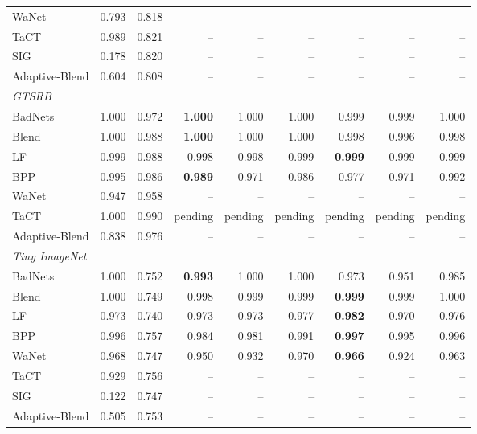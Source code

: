 \begin{table}[htbp]
\begin{tabular}{lrrrrrrrr}
WaNet & 0.793 & 0.818 & -- & -- & -- & -- & -- & -- \\
TaCT & 0.989 & 0.821 & -- & -- & -- & -- & -- & -- \\
SIG & 0.178 & 0.820 & -- & -- & -- & -- & -- & -- \\
Adaptive-Blend & 0.604 & 0.808 & -- & -- & -- & -- & -- & -- \\
\midrule
\multicolumn{9}{l}{\textit{GTSRB}} \\
BadNets & 1.000 & 0.972 & \textbf{1.000} & 1.000 & 1.000 & 0.999 & 0.999 & 1.000 \\
Blend & 1.000 & 0.988 & \textbf{1.000} & 1.000 & 1.000 & 0.998 & 0.996 & 0.998 \\
LF & 0.999 & 0.988 & 0.998 & 0.998 & 0.999 & \textbf{0.999} & 0.999 & 0.999 \\
BPP & 0.995 & 0.986 & \textbf{0.989} & 0.971 & 0.986 & 0.977 & 0.971 & 0.992 \\
WaNet & 0.947 & 0.958 & -- & -- & -- & -- & -- & -- \\
TaCT & 1.000 & 0.990 & pending & pending & pending & pending & pending & pending \\
Adaptive-Blend & 0.838 & 0.976 & -- & -- & -- & -- & -- & -- \\
\midrule
\multicolumn{9}{l}{\textit{Tiny ImageNet}} \\
BadNets & 1.000 & 0.752 & \textbf{0.993} & 1.000 & 1.000 & 0.973 & 0.951 & 0.985 \\
Blend & 1.000 & 0.749 & 0.998 & 0.999 & 0.999 & \textbf{0.999} & 0.999 & 1.000 \\
LF & 0.973 & 0.740 & 0.973 & 0.973 & 0.977 & \textbf{0.982} & 0.970 & 0.976 \\
BPP & 0.996 & 0.757 & 0.984 & 0.981 & 0.991 & \textbf{0.997} & 0.995 & 0.996 \\
WaNet & 0.968 & 0.747 & 0.950 & 0.932 & 0.970 & \textbf{0.966} & 0.924 & 0.963 \\
TaCT & 0.929 & 0.756 & -- & -- & -- & -- & -- & -- \\
SIG & 0.122 & 0.747 & -- & -- & -- & -- & -- & -- \\
Adaptive-Blend & 0.505 & 0.753 & -- & -- & -- & -- & -- & -- \\
\bottomrule
\end{tabular}
\end{table}
